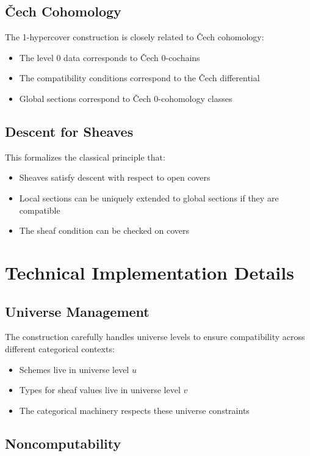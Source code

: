 \documentclass{article}
\theoremstyle{definition}
\begin{document}
\subsection{Čech Cohomology}

The 1-hypercover construction is closely related to Čech cohomology:
\begin{itemize}
\item The level 0 data corresponds to Čech 0-cochains
\item The compatibility conditions correspond to the Čech differential
\item Global sections correspond to Čech 0-cohomology classes
\end{itemize}

\subsection{Descent for Sheaves}

This formalizes the classical principle that:
\begin{itemize}
\item Sheaves satisfy descent with respect to open covers
\item Local sections can be uniquely extended to global sections if they are compatible
\item The sheaf condition can be checked on covers
\end{itemize}

\section{Technical Implementation Details}

\subsection{Universe Management}

The construction carefully handles universe levels to ensure compatibility across different categorical contexts:
\begin{itemize}
\item Schemes live in universe level $u$
\item Types for sheaf values live in universe level $v$ 
\item The categorical machinery respects these universe constraints
\end{itemize}

\subsection{Noncomputability}
\end{document}
